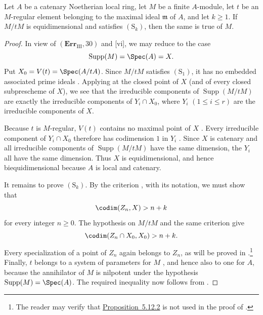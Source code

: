 \begin{proposition}[5.12.2]
\label{IV.5.12.2}
Let $A$ be a catenary Noetherian local ring, let $M$ be a finite
$A$-module, let $t$ be an $M$-regular element belonging to the
maximal ideal $\mathfrak m$ of $A$, and let $k\geq1$.  If $M/tM$
is equidimensional and satisfies $(\mathrm S_k)$, then the same is
true of $M$.
\end{proposition}

\begin{proof}
In view of $(\mathbf{Err}_{\mathrm{III}},30)$ and
[vi], we may reduce to the case
\[
  \operatorname{Supp}(M)=\Spec(A)=X.
\]
Put $X_0=V(t)=\Spec(A/tA)$.  Since $M/tM$ satisfies
$(\mathrm S_1)$, it has no embedded associated prime ideals
.  Applying  at the closed point of
$X$ (and of every closed subprescheme of $X$), we see that the
irreducible components of $\operatorname{Supp}(M/tM)$ are exactly
the irreducible components of $Y_i\cap X_0$, where
$Y_i$ $(1\leq i\leq r)$ are the irreducible components of $X$.

Because $t$ is $M$-regular, $V(t)$ contains no maximal point of
$X$ .  Every irreducible component of
$Y_i\cap X_0$ therefore has codimension $1$ in $Y_i$
.  Since $X$ is catenary and all irreducible
components of $\operatorname{Supp}(M/tM)$ have the same
dimension, the $Y_i$ all have the same dimension.  Thus $X$ is
equidimensional, and hence biequidimensional because $A$ is local
and catenary.

It remains to prove $(\mathrm S_k)$.  By the criterion
, with its notation, we must show that
\[
  \codim(Z_n,X)>n+k
\]
for every integer $n\geq0$.  The hypothesis on $M/tM$ and the same
criterion give
\[
  \codim(Z_n\cap X_0,X_0)>n+k.
\]
Every specialization of a point of $Z_n$ again belongs to $Z_n$,
as will be proved in .\footnote{The reader may
verify that {\hyperlink{ega4.c04.prop.5-12-2}{Proposition~5.12.2}} is not used in the proof of
.}  Finally, $t$ belongs to a system of
parameters for $M$ , and hence also to one for
$A$, because the annihilator of $M$ is nilpotent under the
hypothesis $\operatorname{Supp}(M)=\Spec(A)$.  The required
inequality now follows from .
\end{proof}

